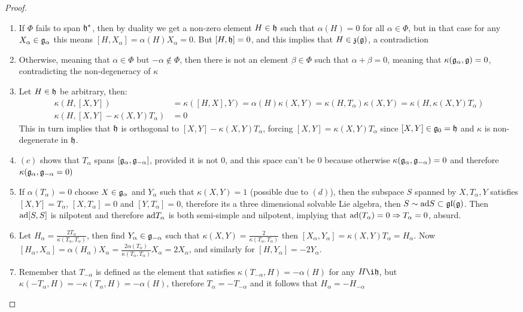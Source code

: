 \begin{proof}
	\begin{enumerate}[label=(\alph*)]
		\item If $\Phi$ fails to span $\mathfrak{h}^*$, then by duality we get a non-zero element $H \in \mathfrak{h}$ such that $\alpha(H)=0$ for all $\alpha \in \Phi$, but in that case for any $X_\alpha \in \mathfrak{g}_\alpha$ this means $[H,X_\alpha]=\alpha(H)X_\alpha =0$.
		But $[H,\mathfrak{h}]=0$, and this implies that $H \in \mathfrak{z}(\mathfrak{g})$, a contradiction
		\item Otherwise, meaning that $\alpha \in \Phi$ but $-\alpha \not \in \Phi$, then there is not an element $\beta \in \Phi$ such that $\alpha + \beta = 0$, meaning that $\kappa(\mathfrak{g}_\alpha,\mathfrak{g})=0$, contradicting the non-degeneracy of $\kappa$
		\item Let $H \in \mathfrak{h}$ be arbitrary, then:
		\begin{align*}
		\kappa(H,[X,Y]) &= \kappa([H,X],Y) = \alpha(H)\kappa(X,Y)=\kappa(H,T_\alpha)\kappa(X,Y)=\kappa(H,\kappa(X,Y)T_\alpha)\\
		\kappa(H,[X,Y]-\kappa(X,Y)T_\alpha)&=0
		\end{align*}
		This in turn implies that $\mathfrak{h}$ is orthogonal to $[X,Y]-\kappa(X,Y)T_\alpha$, forcing $[X,Y]=\kappa(X,Y)T_\alpha$ since $[X,Y] \in \mathfrak{g}_0 = \mathfrak{h}$ and $\kappa$ is non-degenerate in $\mathfrak{h}$.
		\item $(c)$ shows that $T_\alpha$ spans $[\mathfrak{g}_\alpha,\mathfrak{g}_{-\alpha}]$, provided it is not $0$, and this space can't be $0$ because otherwise $\kappa(\mathfrak{g}_\alpha,\mathfrak{g}_{-\alpha})=0$ and therefore $\kappa(\mathfrak{g}_\alpha,\mathfrak{g}_{-\alpha}=0)$
		\item If $\alpha(T_\alpha)=0$ choose $X \in \mathfrak{g}_\alpha$ and $Y_\alpha$ such that $\kappa(X,Y)=1$ (possible due to $(d)$), then the subspace $S$ spanned by ${X,T_\alpha,Y}$ satisfies $[X,Y]=T_\alpha$, $[X,T_\alpha]=0$ and $[Y,T_\alpha]=0$, therefore its a three dimensional solvable Lie algebra, then $S \sim \text{ad} S \subset \mathfrak{gl}(\mathfrak{g})$. Then $\text{ad}[S,S]$ is nilpotent and therefore $\text{ad} T_\alpha$ is both semi-simple and nilpotent, implying that $\text{ad}(T_\alpha)=0 \Rightarrow T_\alpha=0$, absurd. 
		\item Let $H_\alpha = \frac{2T_\alpha}{\kappa(T_\alpha,T_\alpha)}$, then find $Y_\alpha \in \mathfrak{g}_{-\alpha}$ such that $\kappa(X,Y) = \frac{2}{\kappa(T_\alpha,T_\alpha)}$ then $[X_\alpha,Y_\alpha] = \kappa(X,Y)T_\alpha = H_\alpha$.
		Now $[H_\alpha,X_\alpha] = \alpha(H_\alpha)X_\alpha = \frac{2\alpha(T_\alpha)}{\kappa(T_\alpha,T_\alpha)}X_\alpha = 2X_\alpha $, and similarly for $[H,Y_\alpha]=-2Y_\alpha$.
		\item Remember that $T_{-\alpha}$ is defined as the element that satisfies $\kappa(T_{-\alpha},H)=-\alpha(H)$ for any $H \i \h$, but $\kappa(-T_\alpha,H)=-\kappa(T_\alpha,H)=-\alpha(H)$, therefore $T_{\alpha}=-T_{-\alpha}$ and it follows that $H_{\alpha}=-H_{-\alpha}$
		\end{enumerate}
	\end{proof}
